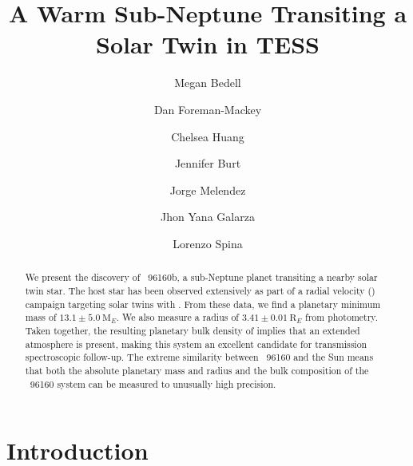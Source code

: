 \documentclass[modern]{aastex62}
\newcommand{\hoststar}{\acronym{HIP}\ 96160\xspace}
\newcommand{\plname}{\acronym{HIP}\ 96160b\xspace}
\newcommand{\plmass}{$13.1 \pm 5.0\ \textrm{M}_{E}$\xspace}
\newcommand{\plradius}{$3.41 \pm 0.01\ \textrm{R}_{E}$\xspace}
\begin{document}
\sloppy\sloppypar\raggedbottom\frenchspacing %

\graphicspath{ {figures/} }

\title{A Warm Sub-Neptune Transiting a Solar Twin in TESS}

\author[0000-0001-9907-7742]{Megan Bedell}
\affiliation{\flatiron}

\author{Dan Foreman-Mackey}
\affiliation{\flatiron}

\author{Chelsea Huang}
\affiliation{\MIT}

\author{Jennifer Burt}
\affiliation{\MIT}

\author{Jorge Melendez}
\affiliation{\USP}

\author{Jhon Yana Galarza}
\affiliation{\USP}

\author{Lorenzo Spina}



\author{}





\begin{abstract}\noindent
We present the discovery of \plname, a sub-Neptune planet transiting a nearby solar twin star. 
The host star has been observed extensively as part of a radial velocity (\RV) campaign targeting solar twins with \HARPS. 
From these data, we find a planetary minimum mass of \plmass. 
We also measure a radius of \plradius from \TESS photometry. 
Taken together, the resulting planetary bulk density of \pldensity implies that an extended atmosphere is present, making this system an excellent candidate for transmission spectroscopic follow-up. 
The extreme similarity between \hoststar and the Sun means that both the absolute planetary mass and radius and the bulk composition of the \hoststar system can be measured to unusually high precision. 

\end{abstract}


\section{Introduction}
\label{s:intro}
\end{document}
